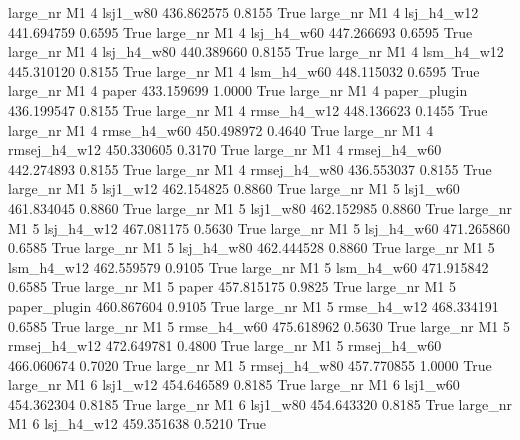   large_nr       M1                 4     lsj1_w80  436.862575      0.8155    True
  large_nr       M1                 4   lsj_h4_w12  441.694759      0.6595    True
  large_nr       M1                 4   lsj_h4_w60  447.266693      0.6595    True
  large_nr       M1                 4   lsj_h4_w80  440.389660      0.8155    True
  large_nr       M1                 4   lsm_h4_w12  445.310120      0.8155    True
  large_nr       M1                 4   lsm_h4_w60  448.115032      0.6595    True
  large_nr       M1                 4        paper  433.159699      1.0000    True
  large_nr       M1                 4 paper_plugin  436.199547      0.8155    True
  large_nr       M1                 4  rmse_h4_w12  448.136623      0.1455    True
  large_nr       M1                 4  rmse_h4_w60  450.498972      0.4640    True
  large_nr       M1                 4 rmsej_h4_w12  450.330605      0.3170    True
  large_nr       M1                 4 rmsej_h4_w60  442.274893      0.8155    True
  large_nr       M1                 4 rmsej_h4_w80  436.553037      0.8155    True
  large_nr       M1                 5     lsj1_w12  462.154825      0.8860    True
  large_nr       M1                 5     lsj1_w60  461.834045      0.8860    True
  large_nr       M1                 5     lsj1_w80  462.152985      0.8860    True
  large_nr       M1                 5   lsj_h4_w12  467.081175      0.5630    True
  large_nr       M1                 5   lsj_h4_w60  471.265860      0.6585    True
  large_nr       M1                 5   lsj_h4_w80  462.444528      0.8860    True
  large_nr       M1                 5   lsm_h4_w12  462.559579      0.9105    True
  large_nr       M1                 5   lsm_h4_w60  471.915842      0.6585    True
  large_nr       M1                 5        paper  457.815175      0.9825    True
  large_nr       M1                 5 paper_plugin  460.867604      0.9105    True
  large_nr       M1                 5  rmse_h4_w12  468.334191      0.6585    True
  large_nr       M1                 5  rmse_h4_w60  475.618962      0.5630    True
  large_nr       M1                 5 rmsej_h4_w12  472.649781      0.4800    True
  large_nr       M1                 5 rmsej_h4_w60  466.060674      0.7020    True
  large_nr       M1                 5 rmsej_h4_w80  457.770855      1.0000    True
  large_nr       M1                 6     lsj1_w12  454.646589      0.8185    True
  large_nr       M1                 6     lsj1_w60  454.362304      0.8185    True
  large_nr       M1                 6     lsj1_w80  454.643320      0.8185    True
  large_nr       M1                 6   lsj_h4_w12  459.351638      0.5210    True
